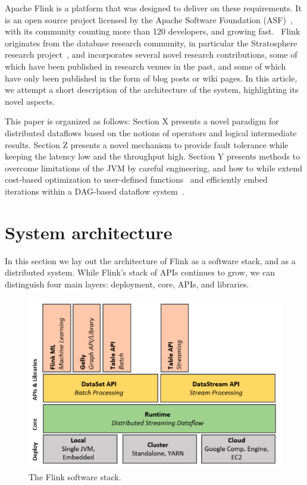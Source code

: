 \documentclass{sig-alternate}
\begin{document}
Apache Flink is a platform that was designed to deliver on these requirements. It is an open source project licensed by the Apache Software Foundation (ASF)~\cite{CUSTOM:web/Apache}, with its community counting more than 120 developers, and growing fast.~\cite{CUSTOM:web/FlinkContrib} Flink originates from the database research community, in particular the Stratosphere research project~\cite{stratosphere}, and incorporates several novel research contributions, some of which have been published in research venues in the past, and some of which have only been published in the form of blog posts or wiki pages. In this article, we attempt a short description of the architecture of the system, highlighting its novel aspects.

This paper is organized as follows: Section X presents a novel paradigm for distributed dataflows based on the notions of operators and logical intermediate results. Section Z presents a novel mechanism to provide fault tolerance while keeping the latency low and the throughput high. Section Y presents methods to overcome limitations of the JVM by careful engineering, and how to while extend cost-based optimization to user-defined functions~\cite{battre2010nephele, DBLP:journals/pvldb/EwenTKM12} and efficiently embed iterations within a DAG-based dataflow system~\cite{DBLP:journals/pvldb/EwenTKM12}. 


\section{System architecture}

In this section we lay out the architecture of Flink as a software stack, and as a distributed system. While Flink's stack of APIs continues to grow, we can distinguish four main layers: deployment, core, APIs, and libraries.

\begin{figure}[h!]
	\centering  	
  	\includegraphics[width=.45\textwidth]{figs/flink_stack.png}
	\caption{The Flink software stack.}
	\label{fig:FlinkStack}
\end{figure}
\end{document}
